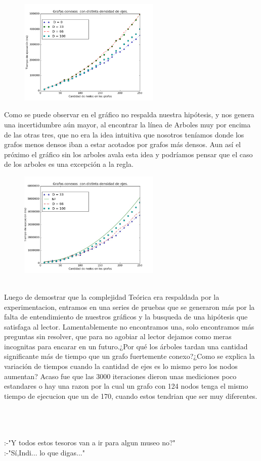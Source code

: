 \documentclass[spanish,12pt]{article}
\begin{document}
\begin{figure}[H]
\centering
\includegraphics[width=0.6\textwidth]{VariasDensidades}
\caption{}
\end{figure}

Como se puede observar en el gráfico no respalda nuestra hipótesis, y nos genera una incertidumbre aún mayor, al encontrar la línea de Arboles muy por encima de las otras tres, que no era la idea intuitiva que nosotros teníamos donde los grafos menos densos iban a estar acotados por grafos más densos. Aun así el próximo el gráfico sin los arboles avala esta idea y podríamos pensar que el caso de los arboles es una excepción a la regla.

\begin{figure}[H]
\centering
\includegraphics[width=0.6\textwidth]{VariasDensidadesSinArbol}
\caption{}
\end{figure}

\\
Luego de demostrar que la complejidad Teórica era respaldada por la experimentacion, entramos en una series de pruebas que se generaron más por la falta de entendimiento de nuestros gráficos y la busqueda de una hipótesis que satisfaga al lector. Lamentablemente no encontramos una, solo encontramos más preguntas sin resolver, que para no agobiar al lector dejamos como meras incognitas para encarar en un futuro.¿Por qué los árboles tardan una cantidad significante más de tiempo que un grafo fuertemente conexo?¿Como se explica la variación de tiempos cuando la cantidad de ejes es lo mismo pero los nodos aumentan? Acaso fue que las 3000 iteraciones dieron unas mediciones poco estandares o hay una razon por la cual un grafo con 124 nodos tenga el mismo tiempo de ejecucion que un de 170, cuando estos tendrian que ser muy diferentes.  


\\

\\
\\






:-"Y todos estos tesoros van a ir para algun museo no?"
\\
:-"Sí,Indi... lo que digas..."
\end{document}
